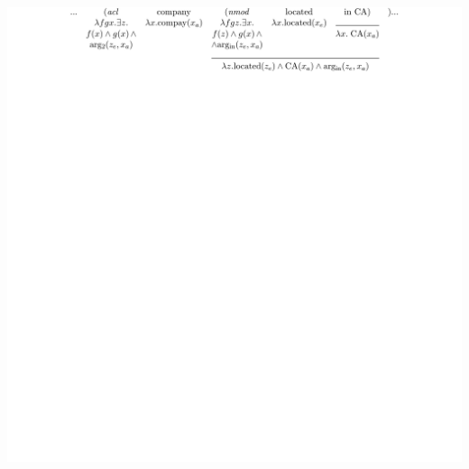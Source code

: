 \documentclass[mathserif,12pt]{beamer}
\begin{document}
\begin{frame}
\begin{center}
{\includegraphics[trim=23em 45em 9em 5em,clip=true,scale=0.9]{figures/dependency-reduced-relative-derivation1-ud}\vspace{4em}}
\end{center}
\end{frame}
\end{document}
